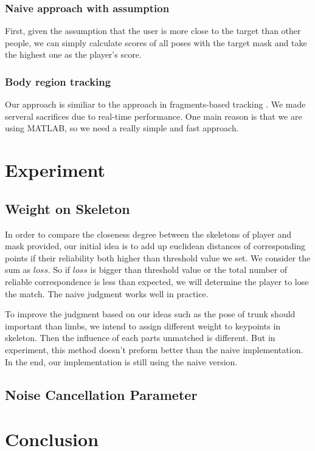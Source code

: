 \documentclass[11pt,twocolumn,letterpaper]{article}
\begin{document}
\subsubsection {Naive approach with assumption}
\par
First, given the assumption that the user is more close to the target than other people, we can simply calculate scores of all poses with the target mask and take the highest one as the player's score.
\subsubsection{Body region tracking}
Our approach is similiar to the approach in fragments-based tracking  \cite{1640835}. We made serveral sacrifices due to real-time performance. One main reason is that we are using MATLAB, so we need a really simple and fast approach.
\section{Experiment}
	\subsection{Weight on Skeleton}
      \par In order to compare the closeness degree between the skeletons of player and mask provided, our initial idea is to add up euclidean distances of corresponding points if their reliability both higher than threshold value we set. We consider the sum as $loss$. So if $loss$ is bigger than threshold value or the total number of reliable correspondence is less than expected, we will determine the player to lose the match. The naive judgment works well in practice.
      \par To improve the judgment based on our ideas such as the pose of trunk should important than limbs, we intend to assign different weight to keypoints in skeleton. Then the influence of each parts unmatched is different. But in experiment, this method doesn't preform better than the naive implementation. In the end, our implementation is still using the naive version.
  \subsection{Noise Cancellation Parameter}
\section{Conclusion}


{\small


}
\end{document}
